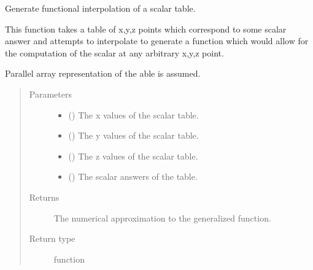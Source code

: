 \documentclass[letterpaper,10pt,english]{sphinxmanual}
\begin{document}
\begin{fulllineitems}
\label{\detokenize{Backend.table_interpolation:Backend.table_interpolation.funt_interpolate_scalar_table}}
Generate functional interpolation of a scalar table.

This function takes a table of x,y,z points which correspond to some scalar
answer and attempts to interpolate to generate a function which would
allow for the computation of the scalar at any arbitrary x,y,z point.

Parallel array representation of the able is assumed.
\begin{quote}\begin{description}
\item[{Parameters}] \leavevmode\begin{itemize}
\item {} 
 () \textendash{} The x values of the scalar table.

\item {} 
 () \textendash{} The y values of the scalar table.

\item {} 
 () \textendash{} The z values of the scalar table.

\item {} 
 () \textendash{} The scalar answers of the table.

\end{itemize}

\item[{Returns}] \leavevmode
{} \textendash{} The numerical approximation to the generalized function.

\item[{Return type}] \leavevmode
function

\end{description}\end{quote}

\end{fulllineitems}
\end{document}
